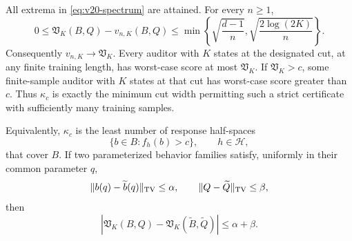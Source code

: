 \begin{theorem}
\label{thm:v20-spectrum}
All extrema in \eqref{eq:v20-spectrum} are attained. For every $n\ge1$,
\begin{equation}\label{eq:v20-rate}
 0\le \mathfrak V_K(B,Q)-v_{n,K}(B,Q)
 \le \min\left\{\sqrt{\frac{d-1}{n}},
                    \sqrt{\frac{2\log(2K)}{n}}\right\}.
\end{equation}
Consequently $v_{n,K}\to\mathfrak V_K$. Every auditor with $K$ states
at the designated cut, at any finite training length, has worst-case
score at most $\mathfrak V_K$. If $\mathfrak V_K>c$, some finite-sample
auditor with $K$ states at that cut has worst-case score greater than $c$.
Thus $\kappa_c$ is exactly the minimum cut width permitting such a strict
certificate with sufficiently many training samples.

Equivalently, $\kappa_c$ is the least number of response half-spaces
\begin{equation}\label{eq:v20-halfspaces}
 \{b\in B:f_h(b)>c\},\qquad h\in\mathcal H,
\end{equation}
that cover $B$. If two parameterized behavior families satisfy, uniformly
in their common parameter $q$,
\[
 \|b(q)-\widetilde b(q)\|_{\rm TV}\le\alpha,
 \qquad \|Q-\widetilde Q\|_{\rm TV}\le\beta,
\]
then
\begin{equation}\label{eq:v20-spectrumstable}
 |\mathfrak V_K(B,Q)-\mathfrak V_K(\widetilde B,\widetilde Q)|
 \le\alpha+\beta.
\end{equation}
\end{theorem}
